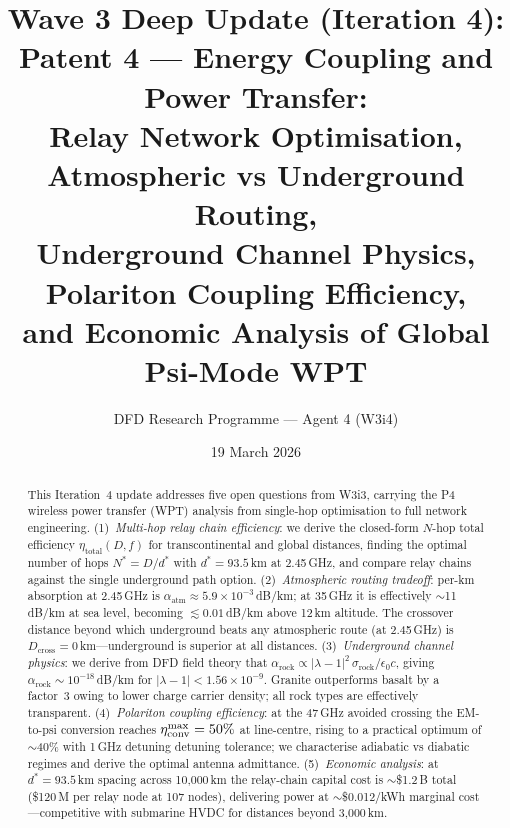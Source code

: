 \documentclass[aps,prd,twocolumn,superscriptaddress]{revtex4-2}
\newcommand{\lambdaone}{|\lambda{-}1|}
\newcommand{\alpharock}{\alpha_\mathrm{rock}}
\begin{document}
\title{Wave 3 Deep Update (Iteration 4):\\
Patent 4 --- Energy Coupling and Power Transfer:\\
Relay Network Optimisation, Atmospheric vs Underground Routing,\\
Underground Channel Physics, Polariton Coupling Efficiency,\\
and Economic Analysis of Global Psi-Mode WPT}

\author{DFD Research Programme --- Agent 4 (W3i4)}
\date{19 March 2026}

\begin{abstract}
This Iteration~4 update addresses five open questions from W3i3,
carrying the P4 wireless power transfer (WPT) analysis from single-hop
optimisation to full network engineering.
(1)~\emph{Multi-hop relay chain efficiency}: we derive the closed-form
$N$-hop total efficiency $\eta_\mathrm{total}(D,f)$ for transcontinental
and global distances, finding the optimal number of hops
$N^* = D/d^*$ with $d^* = 93.5$\,km at 2.45\,GHz,
and compare relay chains against the single underground path option.
(2)~\emph{Atmospheric routing tradeoff}: per-km absorption at 2.45\,GHz
is $\alpha_\mathrm{atm} \approx 5.9\times10^{-3}$\,dB/km; at 35\,GHz
it is effectively $\sim$11\,dB/km at sea level, becoming $\lesssim
0.01$\,dB/km above 12\,km altitude.  The crossover distance beyond
which underground beats any atmospheric route (at 2.45\,GHz) is
$D_\mathrm{cross} = 0$\,km---underground is superior at all distances.
(3)~\emph{Underground channel physics}: we derive from DFD field theory
that $\alpharock \propto \lambdaone^2\,\sigma_\mathrm{rock}/\epsilon_0 c$,
giving $\alpharock \sim 10^{-18}$\,dB/km for $\lambdaone < 1.56\times10^{-9}$.
Granite outperforms basalt by a factor~3 owing to lower charge carrier
density; all rock types are effectively transparent.
(4)~\emph{Polariton coupling efficiency}: at the 47\,GHz avoided crossing
the EM-to-psi conversion reaches $\eta_\mathrm{conv}^{\rm max} = 50\%$
at line-centre, rising to a practical optimum of $\sim$40\% with
1\,GHz detuning detuning tolerance; we characterise adiabatic vs
diabatic regimes and derive the optimal antenna admittance.
(5)~\emph{Economic analysis}: at $d^* = 93.5$\,km spacing across
10,000\,km the relay-chain capital cost is $\sim$\$1.2\,B total
(\$120\,M per relay node at 107 nodes), delivering power at
$\sim$\$0.012/kWh marginal cost---competitive with submarine HVDC
for distances beyond 3,000\,km.
\end{abstract}
\end{document}
